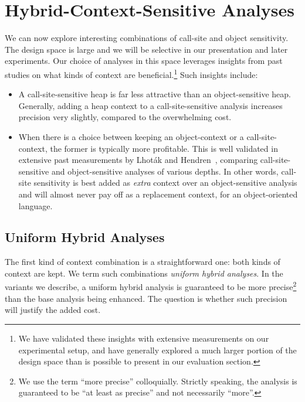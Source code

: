 \section{Hybrid-Context-Sensitive Analyses}
\label{sec:hybrid:main}

We can now explore interesting combinations of call-site and object sensitivity. The design space is large and we will be selective in our presentation and later experiments. Our choice of analyses in this space leverages insights from past studies on what kinds of context are beneficial.\footnote{We have validated these insights with extensive measurements on our experimental setup, and have generally explored a much larger portion of the design space than is possible to present in our evaluation section.} Such insights include:

\begin{itemize}
\item A call-site-sensitive heap is far less attractive than an object-sensitive heap. Generally, adding a heap context to a call-site-sensitive analysis increases precision very slightly, compared to the overwhelming cost.

\item When there is a choice between keeping an object-context or a call-site-context, the former is typically more profitable. This is well validated in extensive past measurements by Lhot\'{a}k and Hendren~\cite{article:2008:tosem:Lhotak}, comparing call-site-sensitive and object-sensitive analyses of various depths. In other words, call-site sensitivity is best added as \emph{extra} context over an object-sensitive analysis and will almost never pay off as a replacement context, for an object-oriented language.
\end{itemize}


\subsection{Uniform Hybrid Analyses}

The first kind of context combination is a straightforward one: both kinds of context are kept. We term such combinations \emph{uniform hybrid analyses}. In the variants we describe, a uniform hybrid analysis is guaranteed to be more precise\footnote{We use the term ``more precise'' colloquially. Strictly speaking, the analysis is guaranteed to be ``at least as precise'' and not necessarily ``more''.} than the base analysis being enhanced. The question is whether such precision will justify the added cost.

